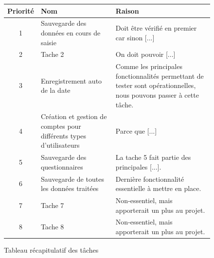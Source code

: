 \begin{figure}[H]
    \begin{center}
        \begin{tabularx}{17cm}{|c|p{6cm}|X|}
            \hline
            Priorité & Nom & Raison\\
            \hline
            1 & Sauvegarde des données en cours
            de saisie & Doit être vérifié en premier car sinon [...] \tabularnewline
            2 & Tache 2 & On doit pouvoir [...] \tabularnewline
            3 & Enregistrement auto de la date & Comme les principales fonctionnalités permettant de tester sont opérationnelles, nous pouvons passer à cette tâche. \tabularnewline
            4 & Création et gestion de comptes
            pour différents types d’utilisateurs & Parce que [...] \tabularnewline
            5 & Sauvegarde des questionnaires & La tache 5 fait partie des principales [...]. \tabularnewline
            6 & Sauvegarde de toutes les données
            traitées & Dernière fonctionnalité essentielle à mettre en place. \tabularnewline
            7 & Tache 7 & Non-essentiel, mais apporterait un plus au projet. \tabularnewline
            8 & Tache 8 & Non-essentiel, mais apporterait un plus au projet. \tabularnewline
            \hline
        \end{tabularx}
    \end{center}
    \caption{Tableau récapitulatif des tâches}
\end{figure}

